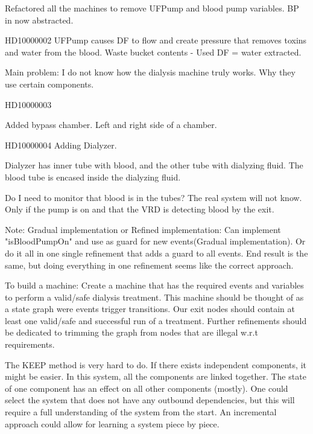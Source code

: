 Refactored all the machines to remove UFPump and blood pump variables. BP in now abstracted. 

HD10000002
UFPump causes DF to flow and create pressure that removes toxins and water from the blood. Waste bucket contents - Used DF = water extracted.

Main problem: I do not know how the dialysis machine truly works. Why they use certain components.


HD10000003

Added bypass chamber. Left and right side of a chamber.


HD10000004
Adding Dialyzer.

Dialyzer has inner tube with blood, and the other tube with dialyzing fluid. The blood tube is encased inside the dialyzing fluid. 

Do I need to monitor that blood is in the tubes? The real system will not know. Only if the pump is on and that the VRD is detecting blood by the exit.

Note: Gradual implementation or Refined implementation: Can implement "isBloodPumpOn" and use as guard for new events(Gradual implementation). Or do it all in one single refinement that adds a guard to all events. End result is the same, but doing everything in one refinement seems like the correct approach. 

To build a machine:
Create a machine that has the required events and variables to perform a valid/safe dialysis treatment. This machine should be thought of as a state graph were events trigger transitions. Our exit nodes should contain at least one valid/safe and successful run of a treatment. Further refinements should be dedicated to trimming the graph from nodes that are illegal w.r.t requirements.

The KEEP method is very hard to do. If there exists independent components, it might be easier. In this system, all the components are linked together.  The state of one component has an effect on all other components (mostly). One could select the system that does not have any outbound dependencies, but this will require a full understanding of the system from the start. An incremental approach could allow for learning a system piece by piece. 










